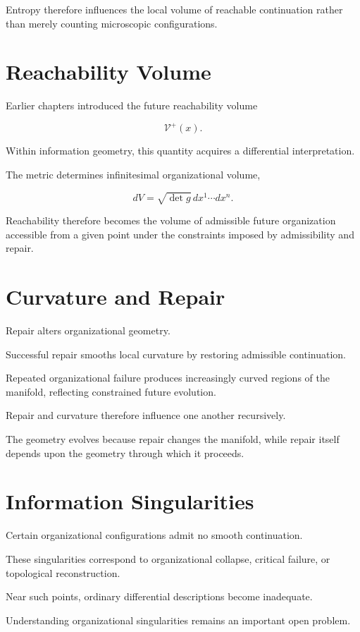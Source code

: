 \documentclass[11pt,oneside]{book}
\numberwithin{equation}{chapter}
\theoremstyle{definition}
\theoremstyle{plain}
\begin{document}
Entropy therefore influences the local volume of reachable continuation
rather than merely counting microscopic configurations.

\section{Reachability Volume}

Earlier chapters introduced the future reachability volume

\[
\mathcal V^+(x).
\]

Within information geometry, this quantity acquires a differential
interpretation.

The metric determines infinitesimal organizational volume,

\[
dV
=
\sqrt{\det g}
\,dx^1
\cdots
dx^n.
\]

Reachability therefore becomes the volume of admissible future
organization accessible from a given point under the constraints imposed
by admissibility and repair.

\section{Curvature and Repair}

Repair alters organizational geometry.

Successful repair smooths local curvature by restoring admissible
continuation.

Repeated organizational failure produces increasingly curved regions of
the manifold, reflecting constrained future evolution.

Repair and curvature therefore influence one another recursively.

The geometry evolves because repair changes the manifold, while repair
itself depends upon the geometry through which it proceeds.

\section{Information Singularities}

Certain organizational configurations admit no smooth continuation.

These singularities correspond to organizational collapse, critical
failure, or topological reconstruction.

Near such points, ordinary differential descriptions become inadequate.

Understanding organizational singularities remains an important open
problem.
\end{document}

